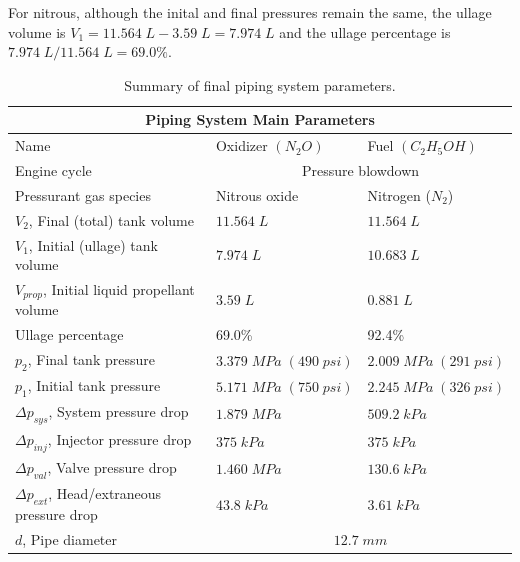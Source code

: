 \documentclass[9pt]{article} %
\numberwithin{equation}{section} %
\begin{document}
For nitrous, although the inital and final pressures remain the same, the ullage volume is $V_{1} = 11.564 \; L - 3.59 \; L = 7.974 \; L$ and the ullage percentage is $7.974 \; L/11.564 \; L = 69.0 \%$.

\begin{table}[!htb]
\centering
\begin{tabular}{ |p{6cm}||p{3.25cm}|p{3.25cm}| }
\hline
\multicolumn{3}{|c|}{Piping System Main Parameters} \\
\hline
Name & Oxidizer $(N_{2}O)$ & Fuel $(C_{2}H_{5}OH)$ \\ 
\hline
Engine cycle & \multicolumn{2}{|c|}{Pressure blowdown}  \\
\hline
Pressurant gas species & Nitrous oxide & Nitrogen ($N_{2}$) \\
$V_{2}$, Final (total) tank volume & $11.564 \; L $ & $11.564 \; L$ \\
$V_{1}$, Initial (ullage) tank volume & $7.974 \; L $ & $10.683 \; L$ \\
$V_{prop}$, Initial liquid propellant volume & $3.59 \; L$ & $0.881 \; L$ \\ 
Ullage percentage & 69.0\% & 92.4\% \\
$p_{2}$, Final tank pressure & $3.379 \; MPa \; (490 \; psi)$ & $2.009 \; MPa \; (291 \; psi)$ \\
$p_{1}$, Initial tank pressure & $5.171 \; MPa \; (750 \; psi)$ & $2.245 \; MPa \; (326 \; psi)$ \\
$\Delta p_{sys}$, System pressure drop & $1.879 \; MPa$ & $509.2 \; kPa$ \\
$\Delta p_{inj}$, Injector pressure drop & $375 \; kPa$ & $375 \; kPa$ \\
$\Delta p_{val}$, Valve pressure drop & $1.460 \; MPa$ & $130.6 \; kPa$ \\
$\Delta p_{ext}$, Head/extraneous pressure drop & $43.8 \; kPa$ & $3.61 \; kPa$ \\
\hline
$d$, Pipe diameter & \multicolumn{2}{|c|}{$12.7 \; mm$}  \\
\hline
\end{tabular}
\caption{Summary of final piping system parameters.}
\label{table:piping_system_final_parameters}
\end{table}
\end{document}
